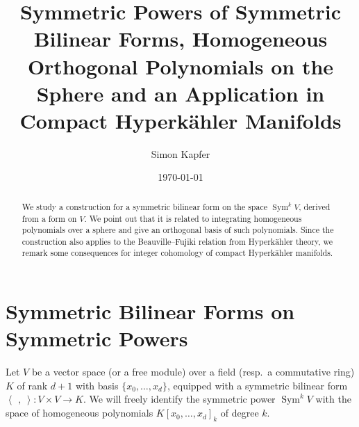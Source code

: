 \documentclass{amsart}
\DeclareMathOperator{\Sym}{Sym}
\theoremstyle{plain}
\theoremstyle{definition}
\theoremstyle{remark}
\begin{document}
\title[Symmetric Powers, Hom.~Orth.~Polynomials, Hyperk\"ahlers]{Symmetric Powers of Symmetric Bilinear Forms, Homogeneous Orthogonal Polynomials on the Sphere and an Application in Compact Hyperk\"ahler Manifolds}


\author{Simon Kapfer}
\address{Simon Kapfer, Laboratoire de Math\'ematiques et Applications, UMR CNRS 6086, Universit\'e de Poitiers, T\'el\'eport 2, Boulevard Marie et Pierre Curie, F-86962 Futuroscope Chasseneuil}


\date{\today}


\begin{abstract} 
We study a construction for a symmetric bilinear form on the space $\Sym^kV$, derived from a form on $V$. We point out that it is related to integrating homogeneous polynomials over a sphere and give an orthogonal basis of such polynomials. Since the construction also applies to the Beauville--Fujiki relation from Hyperk\"ahler theory, we remark some consequences for integer cohomology of compact Hyperk\"ahler manifolds.
\end{abstract}

\maketitle


\section{Symmetric Bilinear Forms on Symmetric Powers}
Let $V$ be a vector space (or a free module) over a field (resp.~a commutative ring) $K$ of rank $d+1$ with basis $\{x_0,\ldots,x_{d}\}$, equipped with a symmetric bilinear form $\left<\,\ ,\ \right>: V\times V \rightarrow K$. We will freely identify the symmetric power $\Sym^kV$ with the space of homogeneous polynomials $K[x_0,\ldots,x_d]_k$ of degree $k$. 
\end{document}
